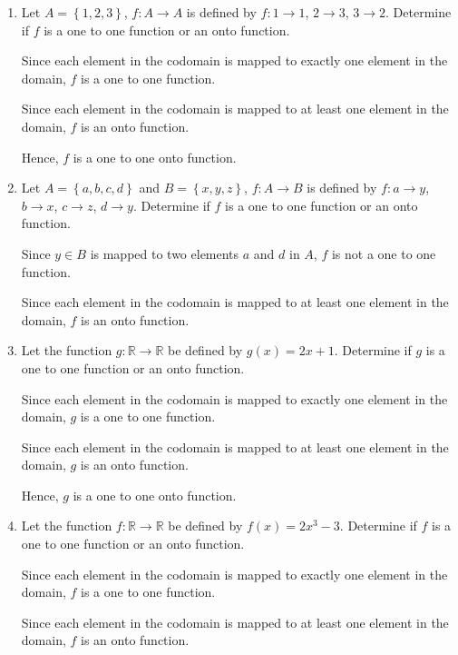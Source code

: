 \documentclass[12pt]{report}
\begin{document}
\begin{enumerate}
  \item Let $A = \left\{1, 2, 3\right\}$, $f: A \to A$ is defined by $f: 1 \to 1$, $2
          \to 3$, $3 \to 2$. Determine if $f$ is a one to one function or an onto
        function. \sol{}

        Since each element in the codomain is mapped to exactly one element in the
        domain, $f$ is a one to one function.

        Since each element in the codomain is mapped to at least one element in the
        domain, $f$ is an onto function.

        Hence, $f$ is a one to one onto function.

  \item Let $A = \left\{a, b, c, d\right\}$ and $B = \left\{x, y, z\right\}$, $f: A \to
          B$ is defined by $f: a \to y$, $b \to x$, $c \to z$, $d \to y$. Determine if
        $f$ is a one to one function or an onto function. \sol{}

        Since $y \in B$ is mapped to two elements $a$ and $d$ in $A$, $f$ is not a one
        to one function.

        Since each element in the codomain is mapped to at least one element in the
        domain, $f$ is an onto function.

  \item Let the function $g: \mathbb{R} \to \mathbb{R}$ be defined by $g(x) = 2x + 1$.
        Determine if $g$ is a one to one function or an onto function. \sol{}

        Since each element in the codomain is mapped to exactly one element in the
        domain, $g$ is a one to one function.

        Since each element in the codomain is mapped to at least one element in the
        domain, $g$ is an onto function.

        Hence, $g$ is a one to one onto function.

  \item Let the function $f: \mathbb{R} \to \mathbb{R}$ be defined by $f(x) = 2x^3 -
          3$. Determine if $f$ is a one to one function or an onto function. \sol{}

        Since each element in the codomain is mapped to exactly one element in the
        domain, $f$ is a one to one function.

        Since each element in the codomain is mapped to at least one element in the
        domain, $f$ is an onto function.


\end{enumerate}
\end{document}

